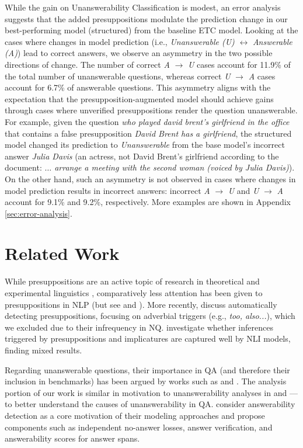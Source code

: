 \documentclass[11pt,a4paper]{article}
\begin{document}
While the gain on Unanswerability Classification is modest, an error analysis suggests that the added presuppositions modulate the prediction change in our best-performing model (structured) from the baseline ETC model. Looking at the cases where changes in model prediction (i.e., \textit{Unanswerable (U)} $\leftrightarrow$ \textit{Answerable (A)}) lead to correct answers, we observe an asymmetry in the two possible directions of change. The number of correct \textit{A} $\rightarrow$ \textit{U} cases account for 11.9\% of the total number of unanswerable questions, whereas correct \textit{U} $\rightarrow$ \textit{A} cases account for 6.7\% of answerable questions. This asymmetry aligns with the expectation that the presupposition-augmented model should achieve gains through cases where unverified presuppositions render the question unanswerable. For example, given the question \textit{who played david brent's girlfriend in the office} that contains a false presupposition \textit{David Brent has a girlfriend}, the structured model changed its prediction to \textit{Unanswerable} from the base model's incorrect answer \textit{Julia Davis} (an actress, not David Brent's girlfriend according to the document: \textit{$\dots$ arrange a meeting with the second woman (voiced by Julia Davis)}). 
On the other hand, such an asymmetry is not observed in cases where changes in model prediction results in incorrect answers: incorrect \textit{A} $\rightarrow$ \textit{U} and \textit{U} $\rightarrow$ \textit{A} account for 9.1\% and 9.2\%, respectively. More examples are shown in  Appendix \ref{sec:error-analysis}. 

\section{Related Work}
While presuppositions are an active topic of research in theoretical and experimental linguistics \citep[\textit{i.a.,}]{beaver1997presupposition,simons2013presupposing,schwarz2016experimental}, comparatively less attention has been given to presuppositions in NLP (but see \citet{clausen2009presupposed} and \citet{tremper2011extending}). More recently, \citet{cianflone2018lets} discuss automatically detecting presuppositions, focusing on adverbial triggers (e.g., \textit{too, also...}), which we excluded due to their infrequency in NQ. \citet{jeretic2020natural} investigate whether inferences triggered by presuppositions and implicatures are captured well by NLI models, finding mixed results. 

Regarding unanswerable questions, their importance in QA (and therefore their inclusion in benchmarks) has been argued by works such as \citet{clark-gardner-2018-simple} and \citet{zhu-etal-2019-learning}. The analysis portion of our work is similar in motivation to unanswerability analyses in \citet{yatskar-2019-qualitative} and \citet{asai2020challenges}---to better understand the causes of unanswerability in QA. \citet{hu2019read,zhang2020retrospective,Back2020NeurQuRI} consider answerability detection as a core motivation of their modeling approaches and propose components such as independent no-answer losses, answer verification, and answerability scores for answer spans.
\end{document}
